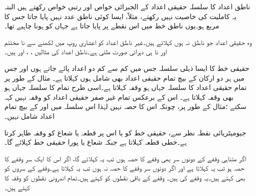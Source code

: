 ناطق اعداد  کا سلسلہ حقیقی اعداد کے الجبرائی خواص اور رتبی خواص  رکھتے ہیں البتہ یہ کاملیت کی خاصیت نہیں رکھتے، مثلاً، ایسا کوئی ناطق عدد نہیں پایا جاتا  جس کا مربع  ہو۔یوں ناطق خط میں اس نقطے پر  پایا جاتا ہے جہاں  کو ہونا چاہیے تھا۔

وہ حقیقی اعداد جو ناطق نہ ہوں  کہلاتے ہیں۔غیر ناطق اعداد کو اعشاری روپ میں لکھنے سے نا مختتم اور نا ہی دہراتی صورت ملتی ہے۔ناطق اعداد  کی مثالیں ، ، اور  ہیں۔

حقیقی خط کا ایسا ذیلی سلسلہ جس میں کم سے کم دو اعداد پائے جاتے ہوں اور جس میں ہر دو ارکان کے بیچ تمام  حقیقی اعداد بھی  شامل ہوں  کہلاتا ہے۔ مثال کے طور  پر تمام حقیقی اعداد  کا سلسلہ جہاں  ہو وقفہ  کہلاتا ہے۔اسی طرح تمام  کا سلسلہ جہاں  ہو بھی وقفہ کہلاتا  ہے۔ اس کے برعکس تمام غیر صفر حقیقی اعداد کو  وقفہ نہیں  کہہ سکتے ؛مثال کے طور پر،  چونکہ  اس کا حصہ نہیں لہٰذا اس  سلسلہ میں    اور  کے بیچ تمام اعداد شامل نہیں۔

جیومیٹریائی  نقطہ نظر سے،  حقیقی خط کو یا اس  پر قطعہ یا شعاع   کو وقفہ  ظاہر کرتا ہے۔خطی قطعہ  کہلاتا ہے  جبکہ شعاع یا پورا حقیقی خط  کہلائے گا۔

اگر متناہی وقفے  کے دونوں سر بھی وقفے   کا حصہ ہوں تب یہ  کہلائے گا، اگر اس کا ایک سر وقفے  کا حصہ ہو تب یہ  کہلاتا ہے اور اگر دونوں سر وقفے کا حصہ  نہ ہوں تب یہ  کہلاتا ہے۔وقفے کے سروں کو  بھی کہتے ہیں۔یہ وقفے  کی   ہیں۔ وقفے  کے باقی نقطوں کو  کہتے ہیں۔تمام اندرونی نقطوں کو وقفہ کا   کہتے ہیں۔

